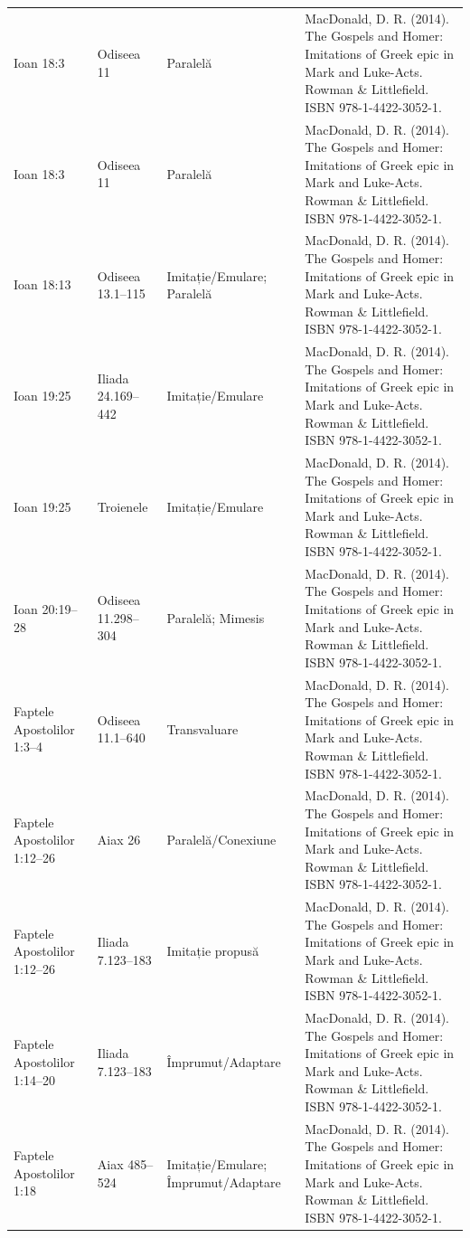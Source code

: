 \documentclass[12pt,a4paper,twoside,openany]{book}
\begin{document}
\begin{longtable}{L{1.4cm}L{1.7cm}L{3.1cm}L{8.4cm}}
Ioan 18:3 & Odiseea 11 & Paralelă & MacDonald, D. R. (2014). The Gospels and Homer: Imitations of Greek epic in Mark and Luke-Acts. Rowman \& Littlefield. ISBN 978-1-4422-3052-1. \\
Ioan 18:3 & Odiseea 11 & Paralelă & MacDonald, D. R. (2014). The Gospels and Homer: Imitations of Greek epic in Mark and Luke-Acts. Rowman \& Littlefield. ISBN 978-1-4422-3052-1. \\
Ioan 18:13 & Odiseea 13.1–115 & Imitație/Emulare; Paralelă & MacDonald, D. R. (2014). The Gospels and Homer: Imitations of Greek epic in Mark and Luke-Acts. Rowman \& Littlefield. ISBN 978-1-4422-3052-1. \\
Ioan 19:25 & Iliada 24.169–442 & Imitație/Emulare & MacDonald, D. R. (2014). The Gospels and Homer: Imitations of Greek epic in Mark and Luke-Acts. Rowman \& Littlefield. ISBN 978-1-4422-3052-1. \\
Ioan 19:25 & Troienele & Imitație/Emulare & MacDonald, D. R. (2014). The Gospels and Homer: Imitations of Greek epic in Mark and Luke-Acts. Rowman \& Littlefield. ISBN 978-1-4422-3052-1. \\
Ioan 20:19–28 & Odiseea 11.298–304 & Paralelă; Mimesis & MacDonald, D. R. (2014). The Gospels and Homer: Imitations of Greek epic in Mark and Luke-Acts. Rowman \& Littlefield. ISBN 978-1-4422-3052-1. \\
Faptele Apostolilor 1:3–4 & Odiseea 11.1–640 & Transvaluare & MacDonald, D. R. (2014). The Gospels and Homer: Imitations of Greek epic in Mark and Luke-Acts. Rowman \& Littlefield. ISBN 978-1-4422-3052-1. \\
Faptele Apostolilor 1:12–26 & Aiax 26 & Paralelă/Conexiune & MacDonald, D. R. (2014). The Gospels and Homer: Imitations of Greek epic in Mark and Luke-Acts. Rowman \& Littlefield. ISBN 978-1-4422-3052-1. \\
Faptele Apostolilor 1:12–26 & Iliada 7.123–183 & Imitație propusă & MacDonald, D. R. (2014). The Gospels and Homer: Imitations of Greek epic in Mark and Luke-Acts. Rowman \& Littlefield. ISBN 978-1-4422-3052-1. \\
Faptele Apostolilor 1:14–20 & Iliada 7.123–183 & Împrumut/Adaptare & MacDonald, D. R. (2014). The Gospels and Homer: Imitations of Greek epic in Mark and Luke-Acts. Rowman \& Littlefield. ISBN 978-1-4422-3052-1. \\
Faptele Apostolilor 1:18 & Aiax 485–524 & Imitație/Emulare; Împrumut/Adaptare & MacDonald, D. R. (2014). The Gospels and Homer: Imitations of Greek epic in Mark and Luke-Acts. Rowman \& Littlefield. ISBN 978-1-4422-3052-1. \\

\end{longtable}
\end{document}
